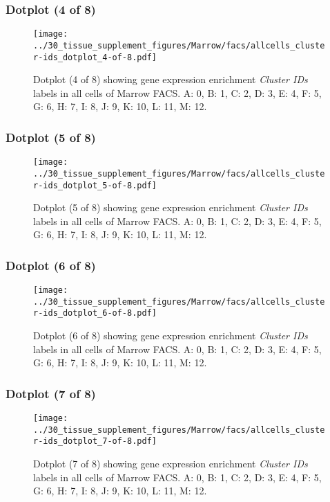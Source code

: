 \clearpage

\subsubsection{Dotplot (4 of 8)}
\begin{figure}[h]
\centering
\texttt{[image: ../30\_tissue\_supplement\_figures/Marrow/facs/allcells\_cluster-ids\_dotplot\_4-of-8.pdf]}

\caption{ Dotplot (4 of 8)  showing gene expression enrichment \emph{Cluster IDs} labels in all cells of Marrow FACS. A: 0, B: 1, C: 2, D: 3, E: 4, F: 5, G: 6, H: 7, I: 8, J: 9, K: 10, L: 11, M: 12.}
\end{figure}


\clearpage

\subsubsection{Dotplot (5 of 8)}
\begin{figure}[h]
\centering
\texttt{[image: ../30\_tissue\_supplement\_figures/Marrow/facs/allcells\_cluster-ids\_dotplot\_5-of-8.pdf]}

\caption{ Dotplot (5 of 8)  showing gene expression enrichment \emph{Cluster IDs} labels in all cells of Marrow FACS. A: 0, B: 1, C: 2, D: 3, E: 4, F: 5, G: 6, H: 7, I: 8, J: 9, K: 10, L: 11, M: 12.}
\end{figure}


\clearpage

\subsubsection{Dotplot (6 of 8)}
\begin{figure}[h]
\centering
\texttt{[image: ../30\_tissue\_supplement\_figures/Marrow/facs/allcells\_cluster-ids\_dotplot\_6-of-8.pdf]}

\caption{ Dotplot (6 of 8)  showing gene expression enrichment \emph{Cluster IDs} labels in all cells of Marrow FACS. A: 0, B: 1, C: 2, D: 3, E: 4, F: 5, G: 6, H: 7, I: 8, J: 9, K: 10, L: 11, M: 12.}
\end{figure}


\clearpage

\subsubsection{Dotplot (7 of 8)}
\begin{figure}[h]
\centering
\texttt{[image: ../30\_tissue\_supplement\_figures/Marrow/facs/allcells\_cluster-ids\_dotplot\_7-of-8.pdf]}

\caption{ Dotplot (7 of 8)  showing gene expression enrichment \emph{Cluster IDs} labels in all cells of Marrow FACS. A: 0, B: 1, C: 2, D: 3, E: 4, F: 5, G: 6, H: 7, I: 8, J: 9, K: 10, L: 11, M: 12.}
\end{figure}


